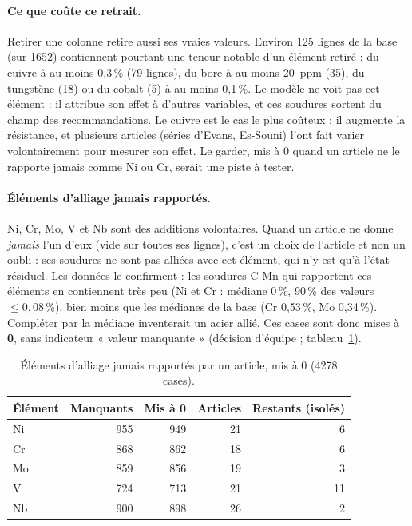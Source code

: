 \paragraph{Ce que coûte ce retrait.} Retirer une colonne retire aussi ses vraies valeurs.
Environ 125 lignes de la base (sur 1652) contiennent pourtant une teneur notable d'un
élément retiré : du cuivre à au moins 0,3\,\% (79 lignes), du bore à au moins
\SI{20}{ppm} (35), du tungstène (18) ou du cobalt (5) à au moins 0,1\,\%. Le modèle ne voit
pas cet élément : il attribue son effet à d'autres variables, et ces soudures sortent du
champ des recommandations. Le cuivre est le cas le plus coûteux : il augmente la
résistance, et plusieurs articles (séries d'Evans, Es-Souni) l'ont fait varier
volontairement pour mesurer son effet. Le garder, mis à 0 quand un article ne le rapporte
jamais comme Ni ou Cr, serait une piste à tester.

\paragraph{Éléments d'alliage jamais rapportés.} Ni, Cr, Mo, V et Nb sont des
additions volontaires. Quand un article ne donne \emph{jamais} l'un d'eux (vide sur toutes
ses lignes), c'est un choix de l'article et non un oubli : ses soudures ne sont pas
alliées avec cet élément, qui n'y est qu'à l'état résiduel. Les données le confirment :
les soudures C-Mn qui rapportent ces éléments en contiennent très peu (Ni et Cr : médiane
0\,\%, 90\,\% des valeurs $\leq 0{,}08$\,\%), bien moins que les médianes de la base
(Cr 0,53\,\%, Mo 0,34\,\%). Compléter par la médiane inventerait un acier allié. Ces
cases sont donc mises à \textbf{0}, sans indicateur « valeur manquante » (décision
d'équipe ; tableau~\ref{tab:alliage-zero}).

\begin{table}[!htbp]
  \centering\small
  \begin{tabular}{@{}l r r r r@{}}
    \toprule
    \textbf{Élément} & \textbf{Manquants} & \textbf{Mis à 0} & \textbf{Articles} &
    \textbf{Restants (isolés)} \\
    \midrule
    Ni & 955 & 949 & 21 & 6  \\
    Cr & 868 & 862 & 18 & 6  \\
    Mo & 859 & 856 & 19 & 3  \\
    V  & 724 & 713 & 21 & 11 \\
    Nb & 900 & 898 & 26 & 2  \\
    \bottomrule
  \end{tabular}
  \caption{Éléments d'alliage jamais rapportés par un article, mis à 0 (4278 cases).}
  \label{tab:alliage-zero}
\end{table}

